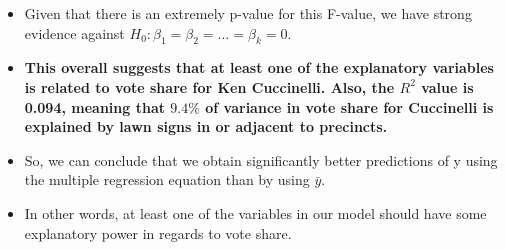 \documentclass[12pt,letterpaper]{article}
\begin{document}
\begin{enumerate}
\begin{itemize}
	\item Given that there is an extremely p-value for this F-value, we have strong evidence against $H_0:  \beta_1 = \beta_2 = \ldots = \beta_k = 0$. 
	\item \textbf{This overall suggests that at least one of the explanatory variables is related to vote share for Ken Cuccinelli. Also, the $R^2$ value is 0.094, meaning that $9.4\%$ of variance in vote share for Cuccinelli is explained by lawn signs in or adjacent to precincts. }
	\item So, we can conclude that we obtain significantly better predictions of y using the multiple regression equation than by using $\bar{y}$.
	\item In other words, at least one of the variables in our model should have some explanatory power in regards to vote share.

	
\end{itemize}
\end{enumerate}  
\end{document}
